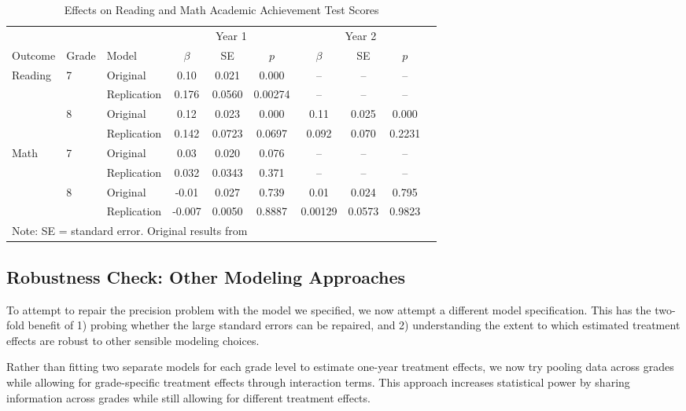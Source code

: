 \documentclass[11pt]{article}
\begin{document}
\begin{table}[htbp]
    \centering
    \caption{Effects on Reading and Math Academic Achievement Test Scores}
    \label{tab:academic-achievement}
    \begin{tabular}{lllccccccc}
    \toprule
    & & & \multicolumn{3}{c}{Year 1} & \multicolumn{3}{c}{Year 2} \\
    \cmidrule(lr){4-6} \cmidrule(lr){7-9}
    Outcome & Grade & Model & $\beta$ & SE & $p$ & $\beta$ & SE & $p$ \\
    \midrule
    \multirow{4}{*}{Reading} & \multirow{2}{*}{7} 
    & Original    & 0.10 & 0.021 & 0.000 & -- & -- & -- \\
    & & Replication & 0.176 & 0.0560 & 0.00274 & -- & -- & -- \\
    \addlinespace[0.3em]
    & \multirow{2}{*}{8} 
    & Original    & 0.12 & 0.023 & 0.000 & 0.11 & 0.025 & 0.000 \\
    & & Replication & 0.142 & 0.0723 & 0.0697 & 0.092 & 0.070 & 0.2231 \\
    \midrule
    \multirow{4}{*}{Math} & \multirow{2}{*}{7}
    & Original    & 0.03 & 0.020 & 0.076 & -- & -- & -- \\
    & & Replication & 0.032 & 0.0343 & 0.371 & -- & -- & -- \\
    \addlinespace[0.3em]
    & \multirow{2}{*}{8}
    & Original    & -0.01 & 0.027 & 0.739 & 0.01 & 0.024 & 0.795 \\
    & & Replication & -0.007 & 0.0050 & 0.8887 & 0.00129 & 0.0573 & 0.9823  \\
    \bottomrule
    \multicolumn{9}{l}{\small Note: SE = standard error. Original results from \cite{dymnickiAssessingImplementationEffects2021}}
    \end{tabular}
\end{table}

\subsection{Robustness Check: Other Modeling Approaches}

To attempt to repair the precision problem with the model we specified, we now
attempt a different model specification. This has the two-fold benefit of 1)
probing whether the large standard errors can be repaired, and 2) understanding
the extent to which estimated treatment effects are robust to other sensible
modeling choices.

Rather than fitting two separate models for each grade level to estimate one-year
treatment effects, we now
try pooling data across grades while
allowing for grade-specific treatment effects through interaction terms. This
approach increases statistical power by sharing information across grades while
still allowing for different treatment effects.
\end{document}
